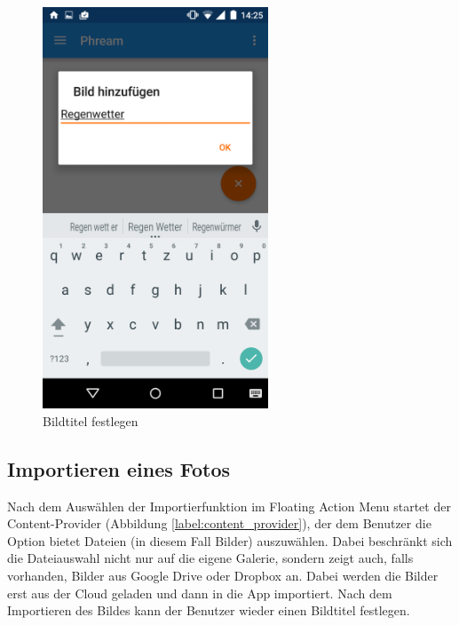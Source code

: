 \begin{figure}[H]
\begin{minipage}{0.4\textwidth}
	\includegraphics[width=0.6\textwidth]{images/screenshots/camera_imagetitle.png}
	\caption{Bildtitel festlegen}
	\label{label:camera_imagetitle}
	\end{minipage}
\end{figure}

\subsection{Importieren eines Fotos}
Nach dem Auswählen der Importierfunktion im Floating Action Menu startet der Content-Provider (Abbildung \ref{label:content_provider}), der dem Benutzer die Option bietet Dateien (in diesem Fall Bilder) auszuwählen. Dabei beschränkt sich die Dateiauswahl nicht nur auf die eigene Galerie, sondern zeigt auch, falls vorhanden, Bilder aus Google Drive oder Dropbox an. Dabei werden die Bilder erst aus der Cloud geladen und dann in die App importiert. Nach dem Importieren des Bildes kann der Benutzer wieder einen Bildtitel festlegen.

